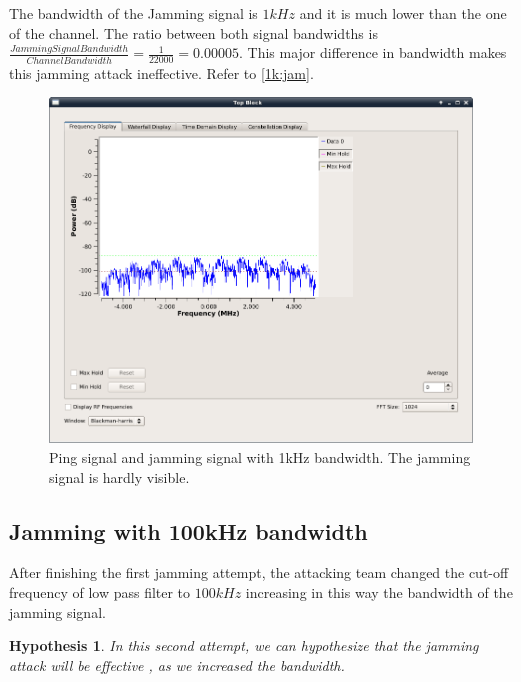 \documentclass[12pt,a4paper]{article}
\newtheorem{hypo}{Hypothesis}
\begin{document}
	The bandwidth of the Jamming signal is $1 kHz$ and it is much lower than the one of the channel. The ratio between both signal bandwidths is $\frac{Jamming Signal Bandwidth}{Channel Bandwidth} = \frac{1}{22000} = 0.00005$. This major difference in bandwidth makes this jamming attack ineffective. Refer to \autoref{1k:jam}.
	\begin{figure}
		\includegraphics[width=\textwidth]{images/mon_1k_ping.png}
%		
	\caption{Ping signal and jamming signal with 1kHz bandwidth. The jamming signal is hardly visible.}
	\label{1k:jam}
	\end{figure}
	

\subsection{Jamming with 100kHz bandwidth}
	After finishing the first jamming attempt, the attacking team changed the cut-off frequency of low pass filter to $100kHz$ increasing in this way the bandwidth of the jamming signal.
	\begin{hypo}
		In this second attempt, we can hypothesize that the jamming attack will be effective , as we increased the bandwidth.
	\end{hypo} 
\end{document}
